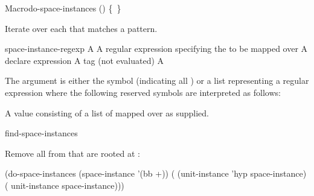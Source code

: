 \documentclass[10pt,twoside,english,pdftex]{article}
\begin{document}
\begin{functiondoc}{Macro}{do-space-instances}%
  {()
    \mbox{\{ \vbar{} \}\superstar}}

\fnsyntax

\fnpurpose Iterate over each  that matches a
 pattern.

\fnpackage {}

\fnmodule {}

\fnargs
\begin{args}{space-instance-regexp}
\arg[var] A 
 A  regular expression
specifying the  to be mapped over
\arg[declaration] A declare expression
\arg[tag] A  tag (not evaluated)
\arg[form] A 
\end{args}

\fndescription 
The  argument is either the symbol
 (indicating all ) or a list
representing a regular expression where the following reserved symbols
are interpreted as follows:
\spaceinstanceregexp

A  value consisting of a list of
 mapped over as supplied.

\begin{alsos}{find-space-instances}
\end{alsos}

\fnexample 
{}%
%
Remove all   from
 that are rooted at :
\begin{example}
  (do-space-instances (space-instance '(bb +))
    ( (unit-instance 'hyp space-instance)
      ( unit-instance space-instance)))
\end{example}

\end{functiondoc}

\end{document}
